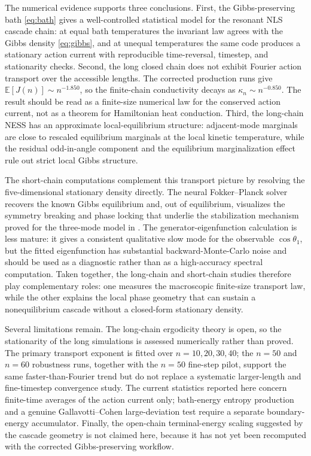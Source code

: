 \documentclass[11pt,a4paper]{article}
\theoremstyle{definition}
\newcommand{\E}{\mathbb{E}}
\numberwithin{equation}{section}   %
\begin{document}
The numerical evidence supports three conclusions. First, the
Gibbs-preserving bath \eqref{eq:bath} gives a well-controlled statistical model
for the resonant NLS cascade chain: at equal bath temperatures the invariant
law agrees with the Gibbs density \eqref{eq:gibbs}, and at unequal temperatures
the same code produces a stationary action current with reproducible
time-reversal, timestep, and stationarity checks. Second, the long closed chain
does not exhibit Fourier action transport over the accessible lengths. The
corrected production runs give $\E[J(n)]\sim n^{-1.850}$, so the finite-chain
conductivity decays as $\kappa_n\sim n^{-0.850}$. The result should be read as
a finite-size numerical law for the conserved action current, not as a theorem
for Hamiltonian heat conduction. Third, the long-chain NESS has an approximate
local-equilibrium structure: adjacent-mode marginals are close to rescaled
equilibrium marginals at the local kinetic temperature, while the residual
odd-in-angle component and the equilibrium marginalization effect rule out
strict local Gibbs structure.

The short-chain computations complement this transport picture by resolving the
five-dimensional stationary density directly. The neural Fokker--Planck solver
recovers the known Gibbs equilibrium and, out of equilibrium, visualizes the
symmetry breaking and phase locking that underlie the stabilization mechanism
proved for the three-mode model in \cite{HLNS}. The generator-eigenfunction
calculation is less mature: it gives a consistent qualitative slow mode for the
observable $\cos\theta_1$, but the fitted eigenfunction has substantial
backward-Monte-Carlo noise and should be used as a diagnostic rather than as a
high-accuracy spectral computation. Taken together, the long-chain and
short-chain studies therefore play complementary roles: one measures the
macroscopic finite-size transport law, while the other explains the local
phase geometry that can sustain a nonequilibrium cascade without a closed-form
stationary density.

Several limitations remain. The long-chain ergodicity theory is open, so the
stationarity of the long simulations is assessed numerically rather than
proved. The primary transport exponent is fitted over $n=10,20,30,40$; the
$n=50$ and $n=60$ robustness runs, together with the $n=50$ fine-step pilot,
support the same faster-than-Fourier trend but do not replace a systematic
larger-length and fine-timestep convergence study. The current statistics reported here concern finite-time averages of
the action current only; bath-energy entropy production and a genuine
Gallavotti--Cohen large-deviation test require a separate boundary-energy
accumulator. Finally, the open-chain terminal-energy scaling suggested by the
cascade geometry is not claimed here, because it has not yet been recomputed
with the corrected Gibbs-preserving workflow.
\end{document}
